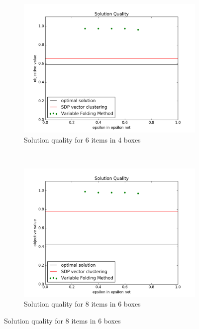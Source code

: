 \documentclass[11pt]{article} %
\begin{document}
\begin{figure}[h!]
	\begin{subfigure}[b]{0.45\textwidth}
	\centering
	\includegraphics[width=\textwidth]{solution_epsilon_n6m4}
	\caption{Solution quality for 6 items in 4 boxes}
	\label{n6m4}
	\end{subfigure}
	~
	\begin{subfigure}[b]{0.45\textwidth}
	\centering
	\includegraphics[width=\textwidth]{solution_epsilon_n8m6}
	\caption{Solution quality for 8 items in 6 boxes}
	\label{n8m6}
	\end{subfigure}


\end{figure}
\end{document}
